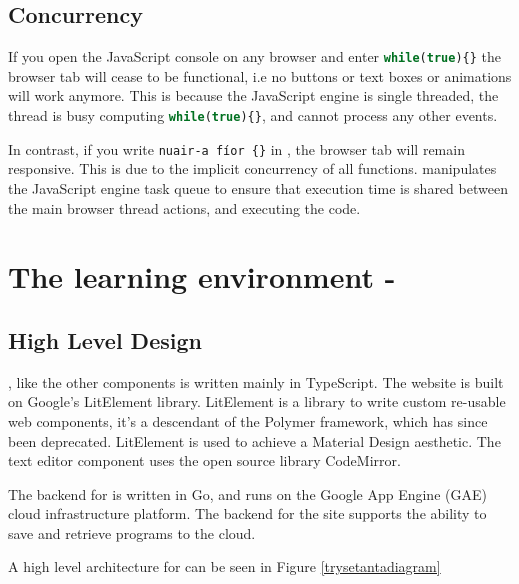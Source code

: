 \subsection{Concurrency}

If you open the JavaScript console on any browser and enter \lstinline[language=javascript]|while(true){}| the browser tab will cease to be functional, i.e no buttons or text boxes or animations will work anymore. This is because the JavaScript engine is single threaded, the thread is busy computing \lstinline[language=javascript]|while(true){}|, and cannot process any other events.

In contrast, if you write \lstinline[language=setanta]|nuair-a fíor {}| in \Setanta{}, the browser tab will remain responsive. This is due to the implicit concurrency of all \Setanta{} functions. \Setanta{} manipulates the JavaScript engine task queue to ensure that execution time is shared between the main browser thread actions, and executing the \Setanta{} code.

\section{The learning environment - \trys{}}

\subsection{High Level Design}

\trys{}, like the other components is written mainly in TypeScript. The website is built on Google's LitElement library. LitElement is a library to write custom re-usable web components, it's a descendant of the Polymer framework, which has since been deprecated. LitElement is used to achieve a Material Design aesthetic. The text editor component uses the open source library CodeMirror.

The backend for \trys{} is written in Go, and runs on the Google App Engine (GAE) cloud infrastructure platform. The backend for the site supports the ability to save and retrieve \Setanta{} programs to the cloud.

A high level architecture for \trys{} can be seen in Figure \ref{trysetantadiagram}

